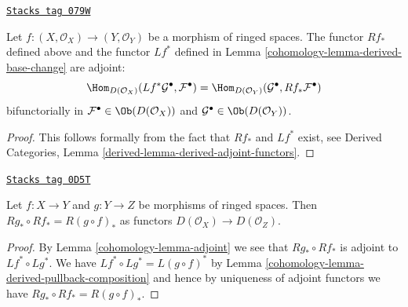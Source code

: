 \begin{lemma}[Adjoint]
\label{cohomology-lemma-adjoint}
\href{https://stacks.math.columbia.edu/tag/079W}{\texttt{Stacks tag 079W}}

Let $f : (X, \mathcal{O}_X) \to (Y, \mathcal{O}_Y)$ be a morphism of
ringed spaces. The functor $Rf_*$ defined above and the functor $Lf^*$
defined in Lemma \ref{cohomology-lemma-derived-base-change} are adjoint:
$$
\Hom_{D(\mathcal{O}_X)}(Lf^*\mathcal{G}^\bullet, \mathcal{F}^\bullet)
=
\Hom_{D(\mathcal{O}_Y)}(\mathcal{G}^\bullet, Rf_*\mathcal{F}^\bullet)
$$
bifunctorially in $\mathcal{F}^\bullet \in \Ob(D(\mathcal{O}_X))$ and
$\mathcal{G}^\bullet \in \Ob(D(\mathcal{O}_Y))$.
\end{lemma}

\begin{proof}
This follows formally from the fact that $Rf_*$ and $Lf^*$ exist, see
Derived Categories, Lemma \ref{derived-lemma-derived-adjoint-functors}.
\end{proof}

\begin{lemma}
\label{cohomology-lemma-derived-pushforward-composition}
\href{https://stacks.math.columbia.edu/tag/0D5T}{\texttt{Stacks tag 0D5T}}

Let $f : X \to Y$ and $g : Y \to Z$ be morphisms of ringed spaces.
Then $Rg_* \circ Rf_* = R(g \circ f)_*$ as functors
$D(\mathcal{O}_X) \to D(\mathcal{O}_Z)$.
\end{lemma}

\begin{proof}

By Lemma \ref{cohomology-lemma-adjoint} we see that $Rg_* \circ Rf_*$
is adjoint to $Lf^* \circ Lg^*$. We have
$Lf^* \circ Lg^* = L(g \circ f)^*$ by
Lemma \ref{cohomology-lemma-derived-pullback-composition}
and hence by
uniqueness of adjoint functors we have $Rg_* \circ Rf_* = R(g \circ f)_*$.
\end{proof}


